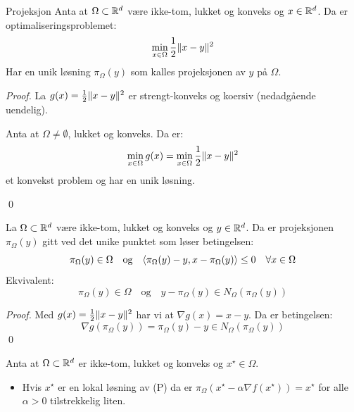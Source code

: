 \begin{lemma}{Projeksjon}{}
  Anta at \(\Omega \subset \mathbb{R}^d\) være ikke-tom, lukket og konveks og \(x \in \mathbb{R}^d\).
  Da er optimaliseringsproblemet:
  \[
    \min_{x \in \Omega} \frac{1}{2} \lVert x - y\rVert^2
  \]
  Har en unik løsning \(\pi_\Omega(y)\) som kalles projeksjonen av \(y\) på \(\Omega\).


\end{lemma}
\begin{proof}{}{}
  La \(g(x) = \frac{1}{2} \lVert x - y\rVert^2\) er strengt-konveks og koersiv (nedadgående uendelig).

  Anta at \(\Omega \neq \emptyset\), lukket og konveks. Da er:
  \[
    \min_{x \in \Omega} g(x) = \min_{x \in \Omega} \frac{1}{2} \lVert x - y\rVert^2
  \]
  et konvekst problem og har en unik løsning.

  \qed
\end{proof}

\begin{proposition}{}{}
  La \(\Omega \subset \mathbb{R}^d\) være ikke-tom, lukket og konveks og \(y \in \mathbb{R}^d\).
  Da er projeksjonen \(\pi_\Omega(y)\) gitt ved det unike punktet som løser betingelsen:
  \[
    \pi_\Omega(y) \in \Omega \quad \text{og} \quad \langle\pi_\Omega(y) - y, x - \pi_\Omega(y)\rangle \leq 0 \quad \forall x \in \Omega
  \]
  Ekvivalent:
  \[
    \pi_\Omega(y) \in \Omega \quad \text{og} \quad y - \pi_\Omega(y) \in N_\Omega(\pi_\Omega(y))
  \]

\end{proposition}

\begin{proof}{}{}
  Med \(g(x) = \frac{1}{2} \lVert x - y\rVert^2\) har vi at \(\nabla g(x) = x - y\).
  Da er betingelsen:
  \[
    \nabla g(\pi_\Omega(y)) = \pi_\Omega(y) - y \in N_\Omega(\pi_\Omega(y))
  \]
  \qed
\end{proof}

\begin{proposition}{}{}
  Anta at \(\Omega \subset \mathbb{R}^d\) er ikke-tom, lukket og konveks og \(x^\star \in \Omega\).
  \begin{itemize}
    \item Hvis \(x^\star\) er en lokal løsning av (P) da er \(\pi_\Omega(x^\star - \alpha \nabla f(x^\star)) = x^\star\) for alle \(\alpha > 0\) tilstrekkelig liten.
  \end{itemize}
\end{proposition}











